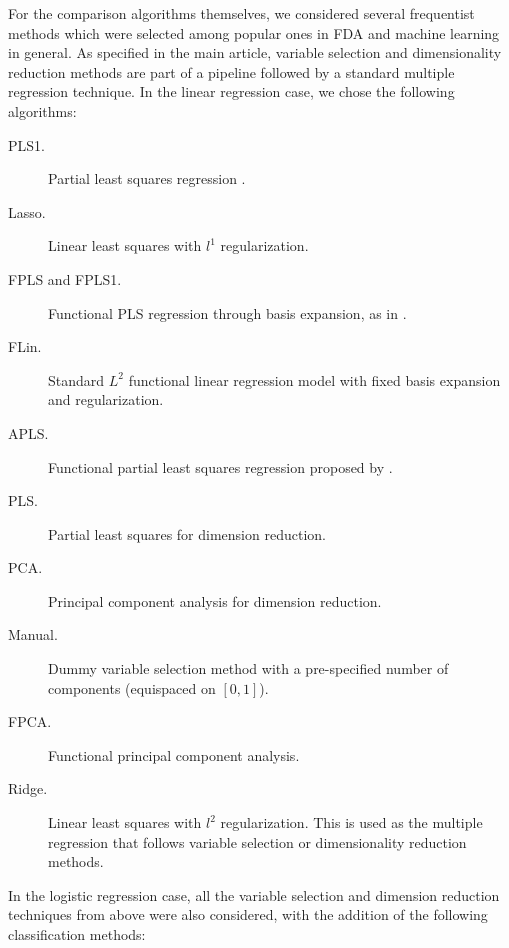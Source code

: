 For the comparison algorithms themselves, we considered several frequentist methods which were selected among popular ones in FDA and machine learning in general. As specified in the main article, variable selection and dimensionality reduction methods are part of a pipeline followed by a standard multiple regression technique. In the linear regression case, we chose the following algorithms:

\begin{description}
  \item [PLS1.] Partial least squares regression \citep[e.g.][]{abdi2010partial}.
  \item[Lasso.] Linear least squares with \(l^1\) regularization.
  \item [FPLS and FPLS1.] Functional PLS regression through basis expansion, as in \citet{aguilera2010using}.
  \item [FLin.] Standard \(L^2\) functional linear regression model with fixed basis expansion and regularization.
  \item [APLS.] Functional partial least squares regression proposed by \citet{delaigle2012methodology}.
  \item [PLS.] Partial least squares for dimension reduction.
  \item [PCA.] Principal component analysis for dimension reduction.
  \item[Manual.] Dummy variable selection method with a pre-specified number of components (equispaced on \([0, 1]\)).
  \item [FPCA.] Functional principal component analysis.
  \item [Ridge.] Linear least squares with \(l^2\) regularization. This is used as the multiple regression that follows variable selection or dimensionality reduction methods.

\end{description}

In the logistic regression case, all the variable selection and dimension reduction techniques from above were also considered, with the addition of the following classification methods:

